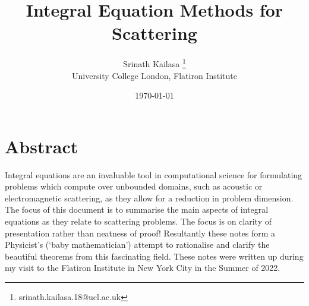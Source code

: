 \documentclass[12pt, a4, twoside]{article}
\title{Integral Equation Methods for Scattering}
\author{Srinath Kailasa \thanks{srinath.kailasa.18@ucl.ac.uk} \\ \small University College London, \small Flatiron Institute}
\date{\today}
\begin{document}
\maketitle

\section*{Abstract}
Integral equations are an invaluable tool in computational science for formulating problems which compute over unbounded domains, such as acoustic or electromagnetic scattering, as they allow for a reduction in problem dimension. The focus of this document is to summarise the main aspects of integral equations as they relate to scattering problems. The focus is on clarity of presentation rather than neatness of proof! Resultantly these notes form a Physicist's (`baby mathematician') attempt to rationalise and clarify the beautiful theorems from this fascinating field. These notes were written up during my visit to the Flatiron Institute in New York City in the Summer of 2022.
\end{document}
